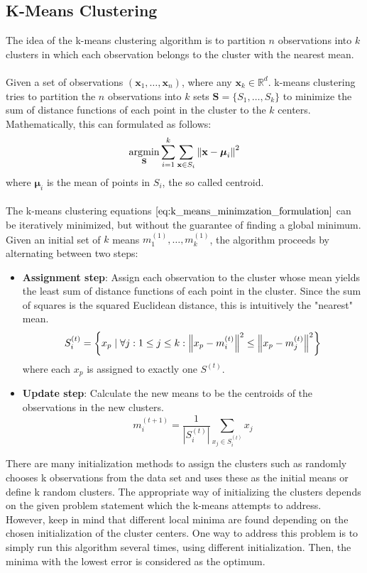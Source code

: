 \subsection{K-Means Clustering}
\label{sec:k_means}
The idea of the k-means clustering algorithm is to partition $n$ observations into $k$ clusters in which each observation belongs to the cluster with the nearest mean. \\ \\
Given a set of observations $(\textbf{x}_1, \dots, \textbf{x}_n)$, where any $\textbf{x}_k \in \mathbb{R}^d$. k-means clustering tries to partition the $n$ observations into $k$ sets $\textbf{S} = \{ S_1, \dots, S_k\}$ to minimize the sum of distance functions of each point in the cluster to the $k$ centers. Mathematically, this can formulated as follows:
\begin{equation}
	\operatorname*{\arg\!\min}_{\textbf{S}} \sum_{i=1}^k \sum_{\textbf{x} \in S_i} \left\lVert\textbf{x} - {\boldsymbol {\mu }}_{i}\right\rVert^2
\label{eq:k_means_minimzation_formulation}
\end{equation}
where ${\boldsymbol {\mu }}_{i}$ is the mean of points in $S_i$, the so called centroid. \\ \\
The k-means clustering equations $\ref{eq:k_means_minimzation_formulation}$ can be iteratively minimized, but without the guarantee of finding a global minimum. Given an initial set of $k$ means $m_1^{(1)}, \dots, m_k^{(1)}$, the algorithm proceeds by alternating between two steps:
\begin{itemize}
\item \textbf{Assignment step}: Assign each observation to the cluster whose mean yields the least sum of distance functions of each point in the cluster. Since the sum of squares is the squared Euclidean distance, this is intuitively the "nearest" mean. 
\begin{equation}
  	S_i^{(t)} = \left\{ x_p \mid \forall j: 1 \leq j \leq k: \left\lVert x_p - m_i^{(t)}\right\rVert^2 \leq \left\lVert x_p - m_j^{(t)}\right\rVert^2 \right\}
\end{equation} 
where each $x_p$ is assigned to exactly one $S^{(t)}$.
\item \textbf{Update step}: Calculate the new means to be the centroids of the observations in the new clusters. 
\begin{equation}
	m_i^{(t+1)} = \frac{1}{\left| S_i^{(t)} \right| } \sum_{x_j \in S_i^{(t)}} x_j
\end{equation}
\end{itemize}
There are many initialization methods to assign the clusters such as randomly chooses k observations from the data set and uses these as the initial means or define k random clusters. The appropriate way of initializing the clusters depends on the given problem statement which the k-means attempts to address. However, keep in mind that different local minima are found depending on the chosen initialization of the cluster centers. One way to address this problem is to simply run this algorithm several times, using different initialization. Then, the minima with the lowest error is considered as the optimum.  
